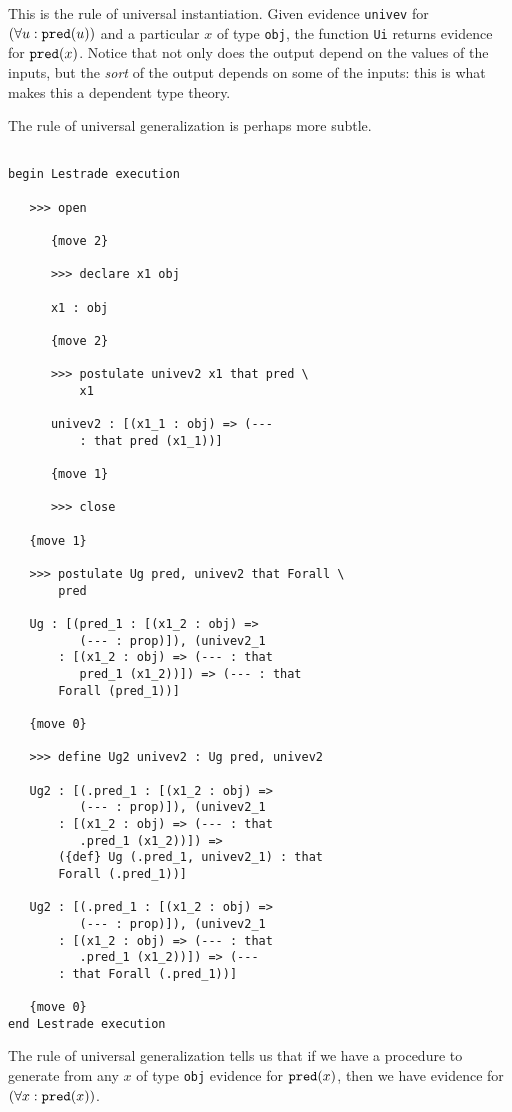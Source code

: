 \documentclass[12pt]{article}
\begin{document}
This is the rule of universal instantiation.  Given evidence {\tt univev} for \newline $(\forall u:{\tt pred}(u))$ and a particular $x$ of type {\tt obj}, the function {\tt Ui} returns evidence for ${\tt pred}(x)$.  Notice that not only does the output depend on the values of the inputs, but the {\em sort\/} of the output depends on some of the inputs:  this is what makes this a dependent type theory.

\newpage

The rule of universal generalization is perhaps more subtle.

\begin{verbatim}

begin Lestrade execution

   >>> open

      {move 2}

      >>> declare x1 obj

      x1 : obj

      {move 2}

      >>> postulate univev2 x1 that pred \
          x1

      univev2 : [(x1_1 : obj) => (--- 
          : that pred (x1_1))]

      {move 1}

      >>> close

   {move 1}

   >>> postulate Ug pred, univev2 that Forall \
       pred

   Ug : [(pred_1 : [(x1_2 : obj) => 
          (--- : prop)]), (univev2_1 
       : [(x1_2 : obj) => (--- : that 
          pred_1 (x1_2))]) => (--- : that 
       Forall (pred_1))]

   {move 0}

   >>> define Ug2 univev2 : Ug pred, univev2

   Ug2 : [(.pred_1 : [(x1_2 : obj) => 
          (--- : prop)]), (univev2_1 
       : [(x1_2 : obj) => (--- : that 
          .pred_1 (x1_2))]) => 
       ({def} Ug (.pred_1, univev2_1) : that 
       Forall (.pred_1))]

   Ug2 : [(.pred_1 : [(x1_2 : obj) => 
          (--- : prop)]), (univev2_1 
       : [(x1_2 : obj) => (--- : that 
          .pred_1 (x1_2))]) => (--- 
       : that Forall (.pred_1))]

   {move 0}
end Lestrade execution

\end{verbatim}

The rule of universal generalization tells us that if we have a procedure to generate from any $x$ of type {\tt obj} evidence for ${\tt pred}(x)$, then we have evidence for $(\forall x:{\tt pred}(x))$.
\end{document}
